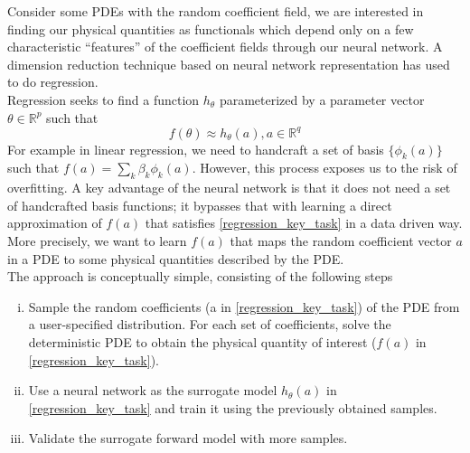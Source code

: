 Consider some PDEs with the random coefficient field, we are interested in finding our physical quantities as functionals which depend only on a few characteristic ``features'' of the coefficient fields through our neural network. A dimension reduction technique based on neural network representation has used to do regression.\\
Regression seeks to find a function $h_{\theta}$ parameterized by a parameter vector $\theta \in \mathbb{R}^{p}$ such that
\begin{equation}
f(\theta) \approx h_{\theta}(a), a\in \mathbb{R}^{q}
\label{regression_key_task}
\end{equation}
For example in linear regression, we need to handcraft a set of basis $\{\phi_k(a)\}$ such that $f(a) = \sum_{k} \beta_k \phi_k(a)$. However, this process exposes us to the risk of overfitting. A key advantage of the neural network is that it does not need a set of handcrafted basis functions; it bypasses that with learning a direct approximation of $f(a)$ that satisfies \eqref{regression_key_task} in a data driven way.\\
More precisely, we want to learn $f(a)$ that maps the random coefficient vector $a$ in a PDE to some physical quantities described by the PDE.\\
The approach is conceptually simple, consisting of the following steps
\begin{enumerate}[i.]
	\item Sample the random coefficients (a in \eqref{regression_key_task}) of the PDE from a user-specified distribution. For each set of coefficients, solve the deterministic PDE to obtain the physical quantity of interest ($f(a)$ in \eqref{regression_key_task}).
	\item Use a neural network as the surrogate model $h_{\theta}(a)$ in \eqref{regression_key_task} and train it using the previously obtained samples.
	\item  Validate the surrogate forward model with more samples. 
\end{enumerate}

